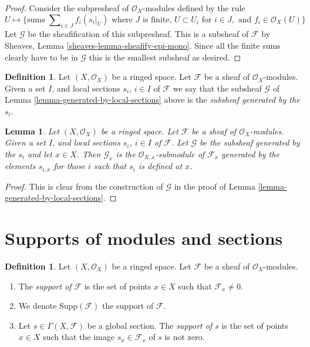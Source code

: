 \documentclass{stacks-project}
\theoremstyle{plain}
\newtheorem{lemma}[subsection]{Lemma}
\theoremstyle{definition}
\newtheorem{definition}[subsection]{Definition}
\theoremstyle{remark}
\numberwithin{equation}{subsection}
\begin{document}
\begin{proof}
Consider the subpresheaf of $\mathcal{O}_X$-modules
defined by the rule
$$
U
\longmapsto
\{
\text{sums } \sum\nolimits_{i \in J} f_i (s_i|_U)
\text{ where } J \text{ is finite, }
U \subset U_i \text{ for } i\in J, \text{ and }
f_i \in \mathcal{O}_X(U)
\}
$$
Let $\mathcal{G}$ be the sheafification of this subpresheaf.
This is a subsheaf of $\mathcal{F}$ by
Sheaves, Lemma \ref{sheaves-lemma-sheafify-epi-mono}.
Since all the finite sums clearly have to be in $\mathcal{G}$
this is the smallest subsheaf as desired.
\end{proof}

\begin{definition}
\label{definition-generated-by-local-sections}
Let $(X, \mathcal{O}_X)$ be a ringed space.
Let $\mathcal{F}$ be a sheaf of $\mathcal{O}_X$-modules.
Given a set $I$, and
local sections $s_i$, $i \in I$ of $\mathcal{F}$
we say that the subsheaf $\mathcal{G}$ of
Lemma \ref{lemma-generated-by-local-sections}
above is the {\it subsheaf generated by the $s_i$}.
\end{definition}

\begin{lemma}
\label{lemma-generated-by-local-sections-stalk}
Let $(X, \mathcal{O}_X)$ be a ringed space.
Let $\mathcal{F}$ be a sheaf of $\mathcal{O}_X$-modules.
Given a set $I$, and
local sections $s_i$, $i \in I$ of $\mathcal{F}$.
Let $\mathcal{G}$ be the subsheaf generated by the
$s_i$ and let $x\in X$.
Then $\mathcal{G}_x$ is the $\mathcal{O}_{X, x}$-submodule of
$\mathcal{F}_x$ generated by the elements $s_{i, x}$
for those $i$ such that $s_i$ is defined at $x$.
\end{lemma}

\begin{proof}
This is clear from the construction of $\mathcal{G}$
in the proof of Lemma \ref{lemma-generated-by-local-sections}.
\end{proof}










\section{Supports of modules and sections}
\label{section-support}

\begin{definition}
\label{definition-support}
Let $(X, \mathcal{O}_X)$ be a ringed space.
Let $\mathcal{F}$ be a sheaf of $\mathcal{O}_X$-modules.
\begin{enumerate}
\item The {\it support of $\mathcal{F}$} is the set of
points $x \in X$ such that $\mathcal{F}_x \not = 0$.
\item We denote $\text{Supp}(\mathcal{F})$ the support of $\mathcal{F}$.
\item Let $s \in \Gamma(X, \mathcal{F})$ be a global section.
The {\it support of $s$} is the set of points $x \in X$
such that the image $s_x \in \mathcal{F}_x$ of $s$ is
not zero.
\end{enumerate}
\end{definition}
\end{document}
